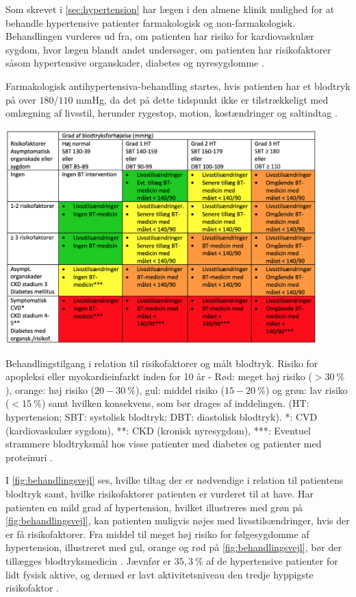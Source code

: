Som skrevet i \autoref{sec:hypertension} har lægen i den almene klinik mulighed for at behandle hypertensive patienter farmakologisk og non-farmakologisk. Behandlingen vurderes ud fra, om patienten har risiko for kardiovaskulær sygdom, hvor lægen blandt andet undersøger, om patienten har risikofaktorer såsom hypertensive organskader, diabetes og nyresygdomme \citep{promedicin2016}.

Farmakologisk antihypertensiva-behandling startes, hvis patienten har et blodtryk på over $180$/$110$ mmHg, da det på dette tidspunkt ikke er tilstrækkeligt med omlægning af livsstil, herunder rygestop, motion, kostændringer og saltindtag \citep{pedersen2016, bech2015}. 

\begin{table}[H]
\centering
\includegraphics[width=0.9\textwidth]{figures/behandlingsvejl}
\caption{Behandlingstilgang i relation til risikofaktorer og målt blodtryk. Risiko for apopleksi eller myokardieinfarkt inden for 10 år - Rød: meget høj risiko ($>30~\%$), orange: høj risiko ($20-30~\%$), gul: middel risiko ($15-20~\%$) og grøn: lav risiko ($<15~\%$) samt hvilken konsekvens, som bør drages af inddelingen. (HT: hypertension; SBT: systolisk blodtryk; DBT: diastolisk blodtryk). *: CVD (kardiovaskulær sygdom), **: CKD (kronisk nyresygdom), ***: Eventuel strammere blodtryksmål hos visse patienter med diabetes og patienter med proteinuri \citep{bech2015}.}
\label{fig:behandlingsvejl}
\end{table}

\noindent
I \autoref{fig:behandlingsvejl} ses, hvilke tiltag der er nødvendige i relation til patientens blodtryk samt, hvilke risikofaktorer patienten er vurderet til at have. Har patienten en mild grad af hypertension, hvilket illustreres med grøn på \autoref{fig:behandlingsvejl}, kan patienten muligvis nøjes med livsstilsændringer, hvis der er få risikofaktorer. Fra middel til meget høj risiko for følgesygdomme af hypertension, illustreret med gul, orange og rød på \autoref{fig:behandlingsvejl}, bør der tillægges blodtryksmedicin \citep{bech2015}.
Jævnfør \citeauthor{munck2007} er $35,3~\%$ af de hypertensive patienter for lidt fysisk aktive, og dermed er lavt aktivitetsniveau den tredje hyppigste risikofaktor \citep{munck2007}.

